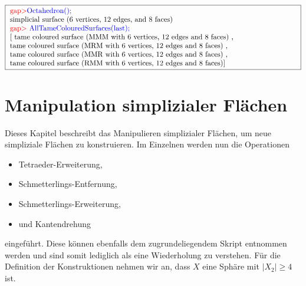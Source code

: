 \documentclass[12pt,titlepage,twoside,cleardoublepage]{article}
\theoremstyle{nummermitklammern}
\numberwithin{equation}{section}
\begin{document}
\begin{center}
$\fbox{
\parbox{14cm}{
\textcolor{red}{gap$>$}\textcolor{blue}{Octahedron();}\newline
simplicial surface (6 vertices, 12 edges, and 8 faces)\newline
\textcolor{red}{gap$>$} \textcolor{blue}{AllTameColouredSurfaces(last);}\newline
[ tame coloured surface (MMM with 6 vertices, 12 edges and 8 faces)
    , \newline
     tame coloured surface (MRM with 6 vertices, 12 edges and 8 faces)
    ,\newline
     tame coloured surface (MMR with 6 vertices, 12 edges and 8 faces)
    ,\newline
  tame coloured surface (RMM with 6 vertices, 12 edges and 8 faces)]
}}
$
\end{center}
\newpage
\section{Manipulation simplizialer Flächen}\label{manipulation}
Dieses Kapitel beschreibt das Manipulieren simplizialer Flächen, um neue simpliziale Flächen zu konstruieren. Im Einzelnen werden nun die Operationen
\begin{itemize}
 \item Tetraeder-Erweiterung,
\item Schmetterlings-Entfernung,
 \item Schmetterlings-Erweiterung,
\item und Kantendrehung
\end{itemize}
 eingeführt.
Diese können ebenfalls dem zugrundeliegendem Skript entnommen werden und sind somit lediglich als eine Wiederholung zu verstehen. Für die Definition der Konstruktionen nehmen wir an, dass $X$ eine Sphäre mit $\vert X_2 \vert \geq 4$ ist.

\end{document}
